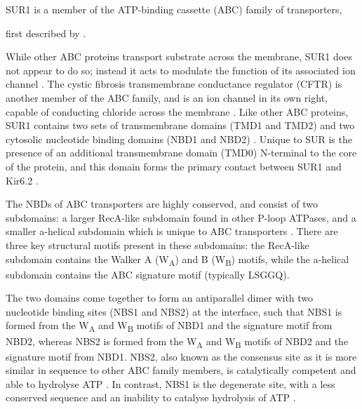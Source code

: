 SUR1 is a member of the ATP-binding cassette (ABC) family of transporters, \begin{mccorrection} first described by \textcite{higgins_family_1986}. \end{mccorrection}
While other ABC proteins transport substrate across the membrane, SUR1 does not appear to do so; instead it acts to modulate the function of its associated ion channel \cite{aguilar-bryan_cloning_1995, tusnady_membrane_1997}.
The cystic fibrosis transmembrane conductance regulator (CFTR) is another member of the ABC family, and is an ion channel in its own right, capable of conducting chloride across the membrane \cite{vergani_cftr_2005}.
Like other ABC proteins, SUR1 contains two sets of transmembrane domains (TMD1 and TMD2) and two cytosolic nucleotide binding domains (NBD1 and NBD2) \cite{aguilar-bryan_cloning_1995, ter_beek_structural_2014}.
Unique to SUR is the presence of an additional transmembrane domain (TMD0) N-terminal to the core of the protein, and this domain forms the primary contact between SUR1 and Kir6.2 \cite{lee_molecular_2017, martin_anti-diabetic_2017-1, li_structure_2017-1, martin_mechanism_2019-1}.

The NBDs of ABC transporters are highly conserved, and consist of two subdomains: a larger RecA-like subdomain found in other P-loop ATPases, and a smaller \textgreek{a}-helical subdomain which is unique to ABC transporters \cite{ter_beek_structural_2014, puljung_cryo-electron_2018}.
There are three key structural motifs present in these subdomains: the RecA-like subdomain contains the Walker A (W\textsubscript{A}) and B (W\textsubscript{B}) motifs, while the \textgreek{a}-helical subdomain contains the ABC signature motif (typically LSGGQ).

The two domains come together to form an antiparallel dimer with two nucleotide binding sites (NBS1 and NBS2) at the interface, such that NBS1 is formed from the W\textsubscript{A} and W\textsubscript{B} motifs of NBD1 and the signature motif from NBD2, whereas NBS2 is formed from the W\textsubscript{A} and W\textsubscript{B} motifs of NBD2 and the signature motif from NBD1.
NBS2, also known as the consensus site as it is more similar in sequence to other ABC family members, is catalytically competent and able to hydrolyse ATP \cite{matsuo_atp_1999, zingman_signaling_2001, de_wet_studies_2007}.
In contrast, NBS1 is the degenerate site, with a less conserved sequence and an inability to catalyse hydrolysis of ATP \cite{ter_beek_structural_2014, puljung_cryo-electron_2018}.

